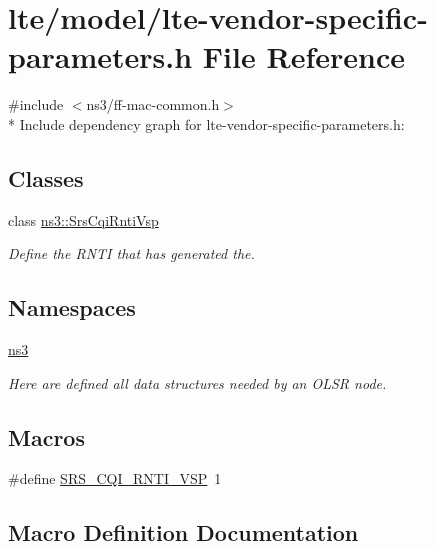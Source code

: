 \hypertarget{lte-vendor-specific-parameters_8h}{}\section{lte/model/lte-\/vendor-\/specific-\/parameters.h File Reference}
\label{lte-vendor-specific-parameters_8h}
{\ttfamily \#include $<$ns3/ff-\/mac-\/common.\+h$>$}\\*
Include dependency graph for lte-\/vendor-\/specific-\/parameters.h\+:
\subsection*{Classes}
\begin{DoxyCompactItemize}
\item 
class \hyperlink{classns3_1_1SrsCqiRntiVsp}{ns3\+::\+Srs\+Cqi\+Rnti\+Vsp}
\begin{DoxyCompactList}\small\item\em Define the R\+N\+TI that has generated the. \end{DoxyCompactList}\end{DoxyCompactItemize}
\subsection*{Namespaces}
\begin{DoxyCompactItemize}
\item 
 \hyperlink{namespacens3}{ns3}
\begin{DoxyCompactList}\small\item\em Here are defined all data structures needed by an O\+L\+SR node. \end{DoxyCompactList}\end{DoxyCompactItemize}
\subsection*{Macros}
\begin{DoxyCompactItemize}
\item 
\#define \hyperlink{lte-vendor-specific-parameters_8h_a3b5e6e766032ab4a8e374a1cfd237a26}{S\+R\+S\+\_\+\+C\+Q\+I\+\_\+\+R\+N\+T\+I\+\_\+\+V\+SP}~1
\end{DoxyCompactItemize}


\subsection{Macro Definition Documentation}
